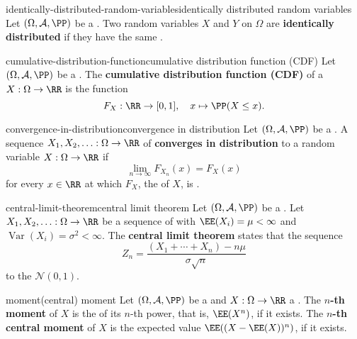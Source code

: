 \begin{topic}{identically-distributed-random-variables}{identically distributed random variables}
    Let $(\Omega, \mathcal{A}, \PP)$ be a . Two random variables $X$ and $Y$ on $\Omega$ are \textbf{identically distributed} if they have the same .
\end{topic}

\begin{topic}{cumulative-distribution-function}{cumulative distribution function (CDF)}
    Let $(\Omega, \mathcal{A}, \PP)$ be a . The \textbf{cumulative distribution function (CDF)} of a  $X : \Omega \to \RR$ is the function
    \[ F_X : \RR \to [0, 1], \quad x \mapsto \PP(X \le x) . \]
\end{topic}

\begin{topic}{convergence-in-distribution}{convergence in distribution}
    Let $(\Omega, \mathcal{A}, \PP)$ be a . A sequence $X_1, X_2, \ldots : \Omega \to \RR$ of  \textbf{converges in distribution} to a random variable $X : \Omega \to \RR$ if
    \[ \lim_{n \to \infty} F_{X_n}(x) = F_X(x) \]
    for every $x \in \RR$ at which $F_X$, the  of $X$, is . 
\end{topic}

\begin{topic}{central-limit-theorem}{central limit theorem}
    Let $(\Omega, \mathcal{A}, \PP)$ be a . Let $X_1, X_2, \ldots : \Omega \to \RR$ be a sequence of    with  $\EE(X_i) = \mu < \infty$ and  $\operatorname{Var}(X_i) = \sigma^2 < \infty$. The \textbf{central limit theorem} states that the sequence
    \[ Z_n = \frac{(X_1 + \cdots + X_n) - n \mu}{\sigma \sqrt{n}} \]
     to the  $\mathcal{N}(0, 1)$.
\end{topic}

\begin{topic}{moment}{(central) moment}
    Let $(\Omega, \mathcal{A}, \PP)$ be a  and $X : \Omega \to \RR$ a . The \textbf{$n$-th moment} of $X$ is the  of its $n$-th power, that is, $\EE(X^n)$, if it exists. The \textbf{$n$-th central moment} of $X$ is the expected value $\EE((X - \EE(X))^n)$, if it exists. 
\end{topic}

